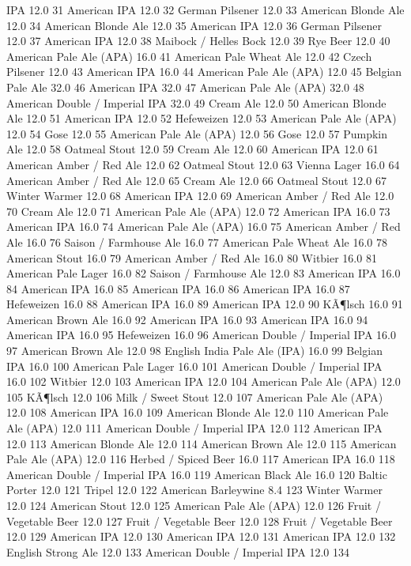 \documentclass[]{article}
\begin{document}
IPA 12.0 31 American IPA 12.0 32 German Pilsener 12.0 33 American Blonde
Ale 12.0 34 American Blonde Ale 12.0 35 American IPA 12.0 36 German
Pilsener 12.0 37 American IPA 12.0 38 Maibock / Helles Bock 12.0 39 Rye
Beer 12.0 40 American Pale Ale (APA) 16.0 41 American Pale Wheat Ale
12.0 42 Czech Pilsener 12.0 43 American IPA 16.0 44 American Pale Ale
(APA) 12.0 45 Belgian Pale Ale 32.0 46 American IPA 32.0 47 American
Pale Ale (APA) 32.0 48 American Double / Imperial IPA 32.0 49 Cream Ale
12.0 50 American Blonde Ale 12.0 51 American IPA 12.0 52 Hefeweizen 12.0
53 American Pale Ale (APA) 12.0 54 Gose 12.0 55 American Pale Ale (APA)
12.0 56 Gose 12.0 57 Pumpkin Ale 12.0 58 Oatmeal Stout 12.0 59 Cream Ale
12.0 60 American IPA 12.0 61 American Amber / Red Ale 12.0 62 Oatmeal
Stout 12.0 63 Vienna Lager 16.0 64 American Amber / Red Ale 12.0 65
Cream Ale 12.0 66 Oatmeal Stout 12.0 67 Winter Warmer 12.0 68 American
IPA 12.0 69 American Amber / Red Ale 12.0 70 Cream Ale 12.0 71 American
Pale Ale (APA) 12.0 72 American IPA 16.0 73 American IPA 16.0 74
American Pale Ale (APA) 16.0 75 American Amber / Red Ale 16.0 76 Saison
/ Farmhouse Ale 16.0 77 American Pale Wheat Ale 16.0 78 American Stout
16.0 79 American Amber / Red Ale 16.0 80 Witbier 16.0 81 American Pale
Lager 16.0 82 Saison / Farmhouse Ale 12.0 83 American IPA 16.0 84
American IPA 16.0 85 American IPA 16.0 86 American IPA 16.0 87
Hefeweizen 16.0 88 American IPA 16.0 89 American IPA 12.0 90 KÃ¶lsch
16.0 91 American Brown Ale 16.0 92 American IPA 16.0 93 American IPA
16.0 94 American IPA 16.0 95 Hefeweizen 16.0 96 American Double /
Imperial IPA 16.0 97 American Brown Ale 12.0 98 English India Pale Ale
(IPA) 16.0 99 Belgian IPA 16.0 100 American Pale Lager 16.0 101 American
Double / Imperial IPA 16.0 102 Witbier 12.0 103 American IPA 12.0 104
American Pale Ale (APA) 12.0 105 KÃ¶lsch 12.0 106 Milk / Sweet Stout
12.0 107 American Pale Ale (APA) 12.0 108 American IPA 16.0 109 American
Blonde Ale 12.0 110 American Pale Ale (APA) 12.0 111 American Double /
Imperial IPA 12.0 112 American IPA 12.0 113 American Blonde Ale 12.0 114
American Brown Ale 12.0 115 American Pale Ale (APA) 12.0 116 Herbed /
Spiced Beer 16.0 117 American IPA 16.0 118 American Double / Imperial
IPA 16.0 119 American Black Ale 16.0 120 Baltic Porter 12.0 121 Tripel
12.0 122 American Barleywine 8.4 123 Winter Warmer 12.0 124 American
Stout 12.0 125 American Pale Ale (APA) 12.0 126 Fruit / Vegetable Beer
12.0 127 Fruit / Vegetable Beer 12.0 128 Fruit / Vegetable Beer 12.0 129
American IPA 12.0 130 American IPA 12.0 131 American IPA 12.0 132
English Strong Ale 12.0 133 American Double / Imperial IPA 12.0 134
\end{document}
